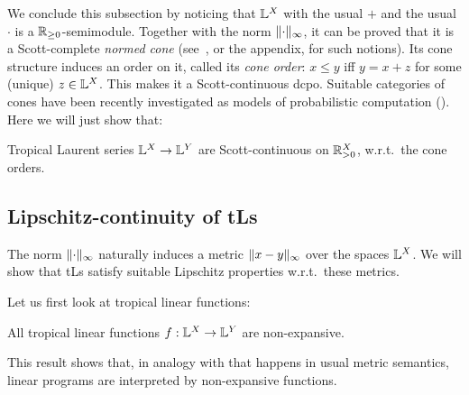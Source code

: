 We conclude this subsection by noticing that $\mathbb{L}^X$ with the usual $+$ and the usual $\cdot$ is a $\mathbb{R}_{\geq0}$-semimodule.
Together with the norm $\lVert\cdot\rVert_\infty$, it can be proved that it is a Scott-complete \emph{normed cone} (see~\cite{Selinger2004}, or the appendix, for such notions).
Its cone structure induces an order on it, called its \emph{cone order}:
$x\leq y$ iff $y=x+z$ for some (unique) $z\in\mathbb{L}^X$.
This makes it a Scott-continuous dcpo.
Suitable categories of cones have been recently investigated as models of probabilistic computation (\cite{Crubillie2018, EhrPagTas2018, Ehrhard2020}).
Here we will just show that:

\begin{theorem}\label{thm:ScottCont}
  Tropical Laurent series $\mathbb{L}^X\to\mathbb{L}^Y$ are Scott-continuous on $\mathbb{R}_{>0}^X$, w.r.t.\ the cone orders.
\end{theorem}


\subsection{Lipschitz-continuity of tLs}\label{sec:4C}%


The norm $\lVert\cdot\rVert_\infty$ naturally induces a metric $\lVert x-y\rVert_{\infty}$ over the spaces $\mathbb{L}^{X}$.
We will show that tLs satisfy suitable Lipschitz properties  w.r.t.~these metrics. 

Let us first look at tropical linear functions:


\begin{proposition}\label{prop:troplinear}
All tropical linear functions $f: \mathbb{L}^{X}\to \mathbb{L}^{Y}$ are non-expansive.  
\end{proposition}
This result shows that, in analogy with that happens in usual metric semantics, linear programs are interpreted by non-expansive functions. 


